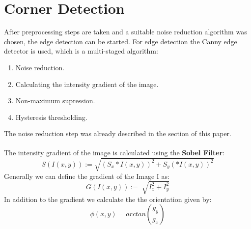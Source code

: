 \documentclass[twocolumn,10pt]{asme2ej}
\begin{document}
\section{Corner Detection}
\label{section:edgedetection}
\noindent
After preprocessing steps are taken and a suitable noise reduction algorithm was chosen, the edge detection can be started.
For edge detection the Canny edge\cite{canny_paper} detector is used, which is a multi-staged algorithm:
\begin{enumerate}
    \item Noise reduction.
    \item Calculating the intensity gradient of the image.
    \item Non-maximum supression.
    \item Hysteresis thresholding.
\end{enumerate}
The noise reduction step was already described in the  section of this paper.
\\\\
The intensity gradient of the image is calculated using the \textbf{Sobel Filter}:
\begin{equation}
    S(I(x,y)) :=\sqrt{(S_x*I(x,y))^2 + S_y(*I(x,y))^2}
\end{equation}
Generally we can define the gradient of the Image I as:
\begin{equation}
    G(I(x,y)) := \sqrt[]{I_x^2 +I_y^2}
\end{equation}
\noindent
In addition to the gradient we calculate the the orientation given by:
\begin{equation}
    \phi(x,y) = arctan(\frac{g_y}{g_x})
\end{equation}
\end{document}
